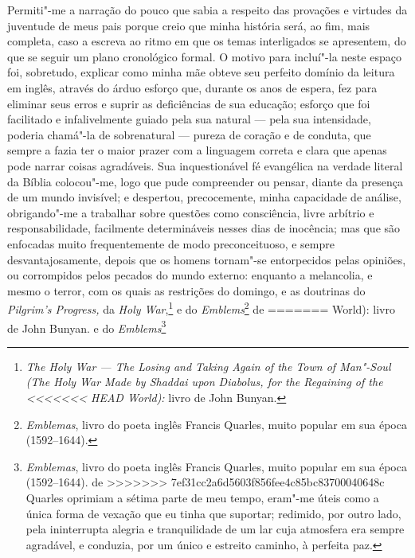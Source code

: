 {{{{{{{{{{{{{{{{{{{{{{{{{{{{%
Permiti"-me a narração do pouco que sabia a respeito das provações e
virtudes da juventude de meus pais porque creio que minha história será,
ao fim, mais completa, caso a escreva ao ritmo em que os temas
interligados se apresentem, do que se seguir um plano cronológico
formal. O motivo para incluí"-la neste espaço foi, sobretudo, explicar
como minha mãe obteve seu perfeito domínio da leitura em inglês, através
do árduo esforço que, durante os anos de espera, fez para eliminar seus
erros e suprir as deficiências de sua educação; esforço que foi
facilitado e infalivelmente guiado pela sua natural --- pela sua
intensidade, poderia chamá"-la de sobrenatural --- pureza de coração e de
conduta, que sempre a fazia ter o maior prazer com a linguagem correta e
clara que apenas pode narrar coisas agradáveis. Sua inquestionável fé
evangélica na verdade literal da Bíblia colocou"-me, logo que pude
compreender ou pensar, diante da presença de um mundo invisível; e
despertou, precocemente, minha capacidade de análise, obrigando"-me a
trabalhar sobre questões como consciência, livre arbítrio e
responsabilidade, facilmente determináveis nesses dias de inocência; mas
que são enfocadas muito frequentemente de modo preconceituoso, e sempre
desvantajosamente, depois que os homens tornam"-se entorpecidos pelas
opiniões, ou corrompidos pelos pecados do mundo externo: enquanto a
melancolia, e mesmo o terror, com os quais as restrições do domingo, e
as doutrinas do \textit{Pilgrim's Progress,} da \textit{Holy War},\footnote{\textit{The
  Holy War --- The Losing and Taking Again of the Town of Man"-Soul (The
  Holy War Made by Shaddai upon Diabolus, for the Regaining of the
<<<<<<< HEAD
  World):} livro de John Bunyan.} e do
\textit{Emblems}\footnote{\textit{Emblemas}, livro do poeta inglês Francis
  Quarles, muito popular em sua época (1592--1644).} de
=======
  World):} livro de John Bunyan.  e do
\textit{Emblems}\footnote{\textit{Emblemas}, livro do poeta inglês Francis
  Quarles, muito popular em sua época (1592--1644).  de
>>>>>>> 7ef31cc2a6d5603f856fee4c85bc83700040648c
Quarles oprimiam a sétima parte de meu tempo, eram"-me úteis como a única
forma de vexação que eu tinha que suportar; redimido, por outro lado,
pela ininterrupta alegria e tranquilidade de um lar cuja atmosfera era
sempre agradável, e conduzia, por um único e estreito caminho, à
perfeita paz.

}}}}}}}}}}}}}}}}}}}}}}}}}}}}
